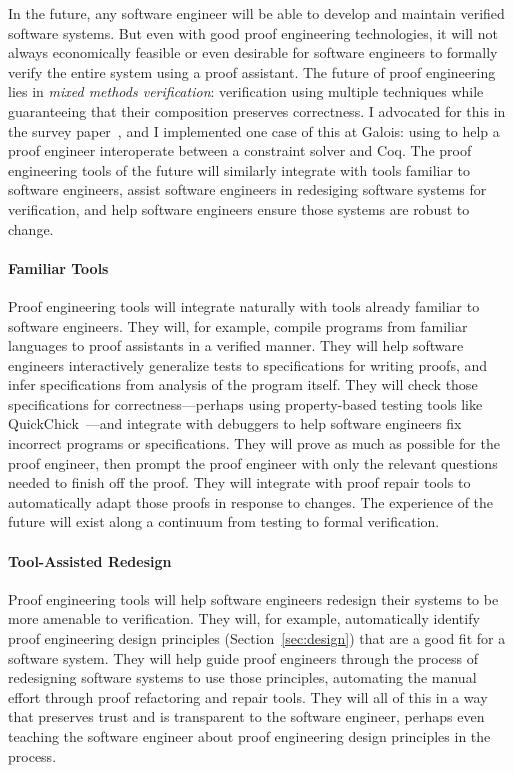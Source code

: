 In the future, any software engineer will be able to develop and maintain verified software systems.
But even with good proof engineering technologies, it will not always economically feasible or even desirable for software engineers to formally verify 
the entire system using a proof assistant.
The future of proof engineering lies in \textit{mixed methods verification}:
verification using multiple techniques while guaranteeing that their composition preserves correctness.
I advocated for this in the survey paper~\cite{PGL-045}, and I implemented one case of this at Galois: using
\sysnamelong to help a proof engineer interoperate between a constraint solver and Coq.
The proof engineering tools of the future will similarly integrate with tools familiar to software engineers,
assist software engineers in redesiging software systems for verification,
and help software engineers ensure those systems are robust to change.

\paragraph{Familiar Tools}
Proof engineering tools will integrate naturally with tools already familiar to software engineers.
They will, for example, compile programs from familiar languages to proof assistants in a verified manner.
They will help software engineers interactively generalize tests to specifications for writing proofs,
and infer specifications from analysis of the program itself.
They will check those specifications for correctness---perhaps using property-based testing tools 
like QuickChick~\cite{Paraskevopoulou2015, lampropoulos2017generating}---and integrate with debuggers to help software engineers 
fix incorrect programs or specifications.
They will prove as much as possible for the proof engineer, then prompt the proof engineer with only the relevant questions
needed to finish off the proof.
They will integrate with proof repair tools to automatically adapt those proofs in response to changes.
The experience of the future will exist along a continuum from testing to formal verification.

\paragraph{Tool-Assisted Redesign} 
Proof engineering tools will help software engineers redesign their systems to be more amenable to verification.
They will, for example, automatically identify proof engineering design principles (Section~\ref{sec:design})
that are a good fit for a software system.
They will help guide proof engineers through the process of redesigning software systems to use those principles,
automating the manual effort through proof refactoring and repair tools.
They will all of this in a way that preserves trust and is transparent to the software engineer,
perhaps even teaching the software engineer about proof engineering design principles in the process.

